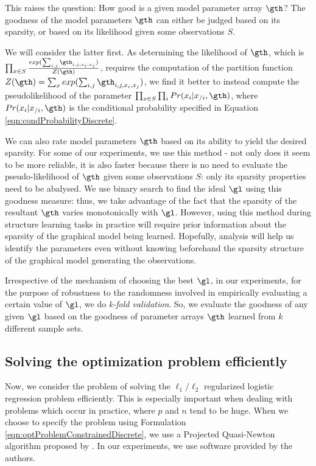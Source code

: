 \documentclass{article}
\begin{document}
This raises the question: How good is a given model parameter array $\gth$? The goodness of the model parameters $\gth$ can either be judged based on its sparsity, or based on its likelihood given some observations $S$.

We will consider the latter first. As determining the likelihood of $\gth$, which is $\prod_{x \in S}\frac{exp(\sum_{i, j} \gth_{i, j, x_i, x_j})}{Z(\gth)}$, requires the computation of the partition function $Z(\gth) = \sum_x exp(\sum_{i, j} \gth_{i, j, x_i, x_j})$, we find it better to instead compute the pseudolikelihood of the parameter $\prod_{x \in S} \prod_i Pr(x_i|x_{/i}, \gth)$, where $Pr(x_i|x_{/i}, \gth)$ is the conditional probability specified in Equation \ref{eqn:condProbabilityDiscrete}.

We can also rate model parameters $\gth$ based on its ability to yield the desired sparsity. For some of our experiments, we use this method - not only does it seem to be more reliable, it is also faster because there is no need to evaluate the pseudo-likelihood of $\gth$ given some observations $S$: only its sparsity properties need to be abalysed. We use binary search to find the ideal $\gl$ using this goodness measure: thus, we take advantage of the fact that the sparsity of the resultant $\gth$ varies monotonically with $\gl$. However, using this method during structure learning tasks in practice will require prior information about the sparsity of the graphical model being learned. Hopefully, analysis will help us identify the parameters even without knowing beforehand the sparsity structure of the graphical model generating the observations.

Irrespective of the mechanism of choosing the best $\gl$, in our experiments, for the purpose of robustness to the randomness involved in empirically evaluating a certain value of $\gl$, we do \textit{k-fold validation}. So, we evaluate the goodness of any given $\gl$ based on the goodness of parameter arrays $\gth$ learned from $k$ different sample sets.

\subsection{Solving the optimization problem efficiently}
Now, we consider the problem of solving the $\ell_1/\ell_2$ regularized logistic regression problem efficiently. This is especially important when dealing with problems which occur in practice, where $p$ and $n$ tend to be huge. When we choose to specify the problem using Formulation \ref{eqn:optProblemConstrainedDiscrete}, we use a Projected Quasi-Newton algorithm proposed by \citet{schmidtPQN}. In our experiments, we use software provided by the authors\cite{schmidtSoftware}.
\end{document}
